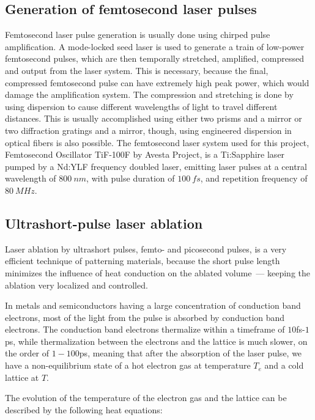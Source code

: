     \subsection{Generation of femtosecond laser pulses}
            Femtosecond laser pulse generation is usually done using chirped pulse amplification. A mode-locked seed laser is used
        to generate a train of low-power femtosecond pulses, which are then temporally stretched, amplified, compressed and output
        from the laser system. This is necessary, because the final, compressed femtosecond pulse can have extremely high peak power,
        which would damage the amplification system\cite{harilal2014femtosecond}.
            The compression and stretching is done by using dispersion to cause different wavelengths of light to travel different distances.
        This is usually accomplished using either two prisms and a mirror or two diffraction gratings and a mirror, though, using engineered
        dispersion in optical fibers is also possible\cite{harilal2014femtosecond}.
            The femtosecond laser system used for this project, Femtosecond Oscillator TiF-100F by Avesta Project, is a Ti:Sapphire laser pumped
        by a Nd:YLF frequency doubled laser, emitting laser pulses at a central wavelength of $800~\si{nm}$, with pulse duration of $100~\si{fs}$,
        and repetition frequency of $80~\si{MHz}$.

    \subsection{Ultrashort-pulse laser ablation}
            Laser ablation by ultrashort pulses, femto- and picosecond pulses, is a very efficient technique of patterning materials, because
        the short pulse length minimizes the influence of heat conduction on the ablated volume~--- keeping the ablation very localized and
        controlled.

            In metals and semiconductors having a large concentration of conduction band electrons, most of the light from the pulse is
        absorbed by conduction band electrons. The conduction band electrons thermalize within a timeframe of $10$fs-$1$ps, while thermalization
        between the electrons and the lattice is much slower, on the order of $1-100$ps, meaning that after the absorption of the laser pulse,
        we have a non-equilibrium state of a hot electron gas at temperature $T_e$ and a cold lattice at $T$. \cite{bauerle2013laser}

        The evolution of the temperature of the electron gas and the lattice can be described by the following heat equations:

